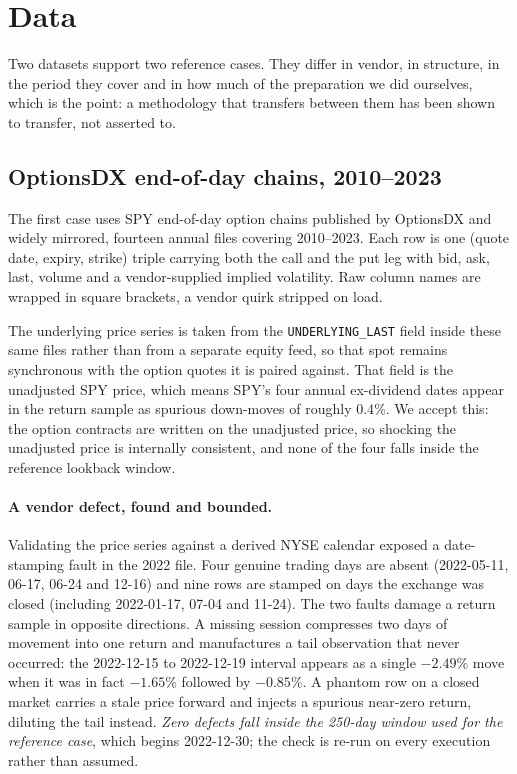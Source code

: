 \documentclass[11pt]{article}
\begin{document}
\section{Data}
\label{sec:data}

Two datasets support two reference cases. They differ in vendor, in structure, in the
period they cover and in how much of the preparation we did ourselves, which is the point:
a methodology that transfers between them has been shown to transfer, not asserted to.

\subsection{OptionsDX end-of-day chains, 2010--2023}

The first case uses SPY end-of-day option chains published by OptionsDX \citep{optionsdx}
and widely
mirrored, fourteen annual files covering 2010--2023. Each row is one (quote date, expiry,
strike) triple carrying both the call and the put leg with bid, ask, last, volume and a
vendor-supplied implied volatility. Raw column names are wrapped in square brackets, a
vendor quirk stripped on load.

The underlying price series is taken from the \texttt{UNDERLYING\_LAST} field inside
these same files rather than from a separate equity feed, so that spot remains
synchronous with the option quotes it is paired against. That field is the unadjusted
SPY price, which means SPY's four annual ex-dividend dates appear in the return sample
as spurious down-moves of roughly $0.4\%$. We accept this: the option contracts are
written on the unadjusted price, so shocking the unadjusted price is internally
consistent, and none of the four falls inside the reference lookback window.

\paragraph{A vendor defect, found and bounded.} Validating the price series against a
derived NYSE calendar exposed a date-stamping fault in the 2022 file. Four genuine
trading days are absent (2022-05-11, 06-17, 06-24 and 12-16) and nine rows are stamped
on days the exchange was closed (including 2022-01-17, 07-04 and 11-24). The two faults
damage a return sample in opposite directions. A missing session compresses two days of
movement into one return and manufactures a tail observation that never occurred: the
2022-12-15 to 2022-12-19 interval appears as a single $-2.49\%$ move when it was in fact
$-1.65\%$ followed by $-0.85\%$. A phantom row on a closed market carries a stale price
forward and injects a spurious near-zero return, diluting the tail instead. \emph{Zero
defects fall inside the 250-day window used for the reference case}, which begins
2022-12-30; the check is re-run on every execution rather than assumed.
\end{document}
